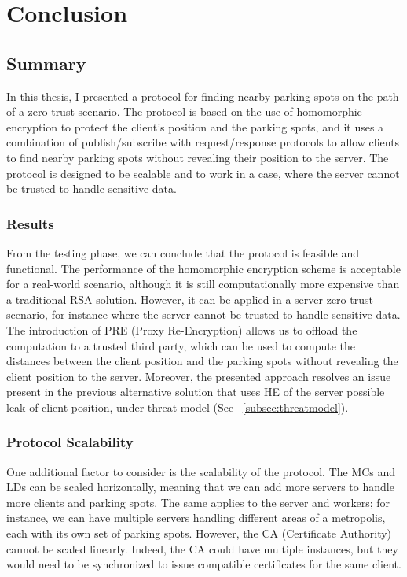 \chapter{Conclusion} \label{chap:conclusion}

\section{Summary}

In this thesis, I presented a protocol for finding nearby parking spots on the path of a zero-trust scenario. The protocol is based on the use of homomorphic encryption to protect the client's position and the parking spots, and it uses a combination of publish/subscribe with request/response protocols to allow clients to find nearby parking spots without revealing their position to the server. The protocol is designed to be scalable and to work in a case, where the server cannot be trusted to handle sensitive data.

\subsection{Results}

From the testing phase, we can conclude that the protocol is feasible and functional. The performance of the homomorphic encryption scheme is acceptable for a real-world scenario, although it is still computationally more expensive than a traditional RSA solution. However, it can be applied in a server zero-trust scenario, for instance where the server cannot be trusted to handle sensitive data. The introduction of PRE (Proxy Re-Encryption) allows us to offload the computation to a trusted third party, which can be used to compute the distances between the client position and the parking spots without revealing the client position to the server. Moreover, the presented approach resolves an issue present in the previous alternative solution that uses HE of the server possible leak of client position, under threat model (See ~\cref{subsec:threatmodel}).

\subsection{Protocol Scalability}

One additional factor to consider is the scalability of the protocol. The MCs and LDs can be scaled horizontally, meaning that we can add more servers to handle more clients and parking spots. The same applies to the server and workers; for instance, we can have multiple servers handling different areas of a metropolis, each with its own set of parking spots. However, the CA (Certificate Authority) cannot be scaled linearly. Indeed, the CA could have multiple instances, but they would need to be synchronized to issue compatible certificates for the same client.

